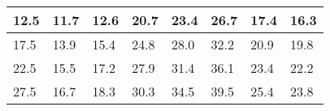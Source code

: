 \begin{table}[H]
\begin{tabular}{|l|l|l|l|l|l|l|l|}
12.5                                    & 11.7                                                                                   & 12.6                                                                                       & 20.7                                                                                   & 23.4                                                                                    & 26.7                                                                                   & 17.4                                                                                 & 16.3                                                                                \\ \hline
17.5                                    & 13.9                                                                                   & 15.4                                                                                       & 24.8                                                                                   & 28.0                                                                                    & 32.2                                                                                   & 20.9                                                                                 & 19.8                                                                                \\ \hline
22.5                                    & 15.5                                                                                   & 17.2                                                                                       & 27.9                                                                                   & 31.4                                                                                    & 36.1                                                                                   & 23.4                                                                                 & 22.2                                                                                \\ \hline
27.5                                    & 16.7                                                                                   & 18.3                                                                                       & 30.3                                                                                   & 34.5                                                                                    & 39.5                                                                                   & 25.4                                                                                 & 23.8                                                                                \\ \hline

\end{tabular}
\end{table}
